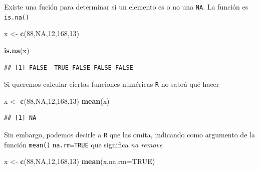 \documentclass[
]{book}
\newenvironment{Shaded}{\begin{snugshade}}{\end{snugshade}}
\newcommand{\AttributeTok}[1]{\textcolor[rgb]{0.13,0.29,0.53}{#1}}
\newcommand{\ConstantTok}[1]{\textcolor[rgb]{0.56,0.35,0.01}{#1}}
\newcommand{\DecValTok}[1]{\textcolor[rgb]{0.00,0.00,0.81}{#1}}
\newcommand{\FunctionTok}[1]{\textcolor[rgb]{0.13,0.29,0.53}{\textbf{#1}}}
\newcommand{\NormalTok}[1]{#1}
\newcommand{\OtherTok}[1]{\textcolor[rgb]{0.56,0.35,0.01}{#1}}
\begin{document}
Existe una fución para determinar si un elemento es o no una \texttt{NA}. La función es \texttt{is.na()}

\begin{Shaded}
\begin{Highlighting}[]
\NormalTok{x }\OtherTok{\textless{}{-}} \FunctionTok{c}\NormalTok{(}\DecValTok{88}\NormalTok{,}\ConstantTok{NA}\NormalTok{,}\DecValTok{12}\NormalTok{,}\DecValTok{168}\NormalTok{,}\DecValTok{13}\NormalTok{)}
\end{Highlighting}
\end{Shaded}

\begin{Shaded}
\begin{Highlighting}[]
\FunctionTok{is.na}\NormalTok{(x)}
\end{Highlighting}
\end{Shaded}

\begin{verbatim}
## [1] FALSE  TRUE FALSE FALSE FALSE
\end{verbatim}

Si queremos calcular ciertas funciones numéricas \texttt{R} no sabrá qué hacer

\begin{Shaded}
\begin{Highlighting}[]
\NormalTok{x }\OtherTok{\textless{}{-}} \FunctionTok{c}\NormalTok{(}\DecValTok{88}\NormalTok{,}\ConstantTok{NA}\NormalTok{,}\DecValTok{12}\NormalTok{,}\DecValTok{168}\NormalTok{,}\DecValTok{13}\NormalTok{)}
\FunctionTok{mean}\NormalTok{(x)}
\end{Highlighting}
\end{Shaded}

\begin{verbatim}
## [1] NA
\end{verbatim}

Sin embargo, podemos decirle a \texttt{R} que las omita, indicando como argumento de la función \texttt{mean()} \texttt{na.rm=TRUE} que significa \emph{na remove}

\begin{Shaded}
\begin{Highlighting}[]
\NormalTok{x }\OtherTok{\textless{}{-}} \FunctionTok{c}\NormalTok{(}\DecValTok{88}\NormalTok{,}\ConstantTok{NA}\NormalTok{,}\DecValTok{12}\NormalTok{,}\DecValTok{168}\NormalTok{,}\DecValTok{13}\NormalTok{)}
\FunctionTok{mean}\NormalTok{(x,}\AttributeTok{na.rm=}\ConstantTok{TRUE}\NormalTok{)}
\end{Highlighting}
\end{Shaded}
\end{document}
